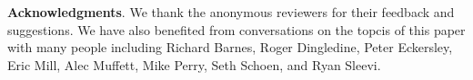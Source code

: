 \documentclass[10pt, conference, compsocconf]{styles/IEEEtran}
\newcommand{\point}[1]{\noindent\textbf{#1}.}
\begin{document}
\point{Acknowledgments}
We thank the anonymous reviewers for their feedback and suggestions.
We have also benefited from conversations on the topcis of this paper
with many people including Richard Barnes, Roger Dingledine, Peter
Eckersley, Eric Mill, Alec Muffett, Mike Perry, Seth Schoen, and Ryan
Sleevi.



 
\newcommand{\BIBdecl}{\setlength{\itemsep}{0\baselineskip plus 0.1\baselineskip minus 0.1\baselineskip}}
\balance
{\footnotesize 


}

 
%
\end{document}

